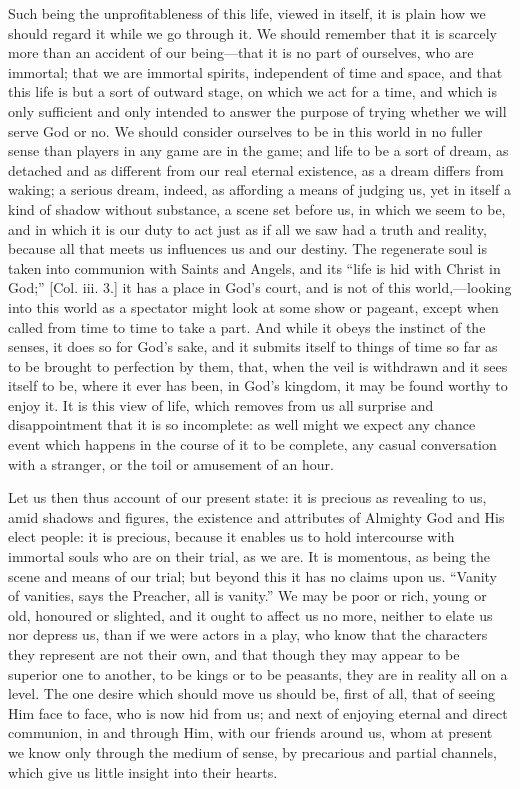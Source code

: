 Such being the unprofitableness of this life, viewed in itself, it
is plain how we should regard it while we go through it. We should
remember that it is scarcely more than an accident of our being—that
it is no part of ourselves, who are immortal; that we are immortal
spirits, independent of time and space, and that this life is but a
sort of outward stage, on which we act for a time, and which is only
sufficient and only intended to answer the purpose of trying whether
we will serve God or no. We should consider ourselves to be in this
world in no fuller sense than players in any game are in the game; and
life to be a sort of dream, as detached and as different from our real
eternal existence, as a dream differs from waking; a serious dream,
indeed, as affording a means of judging us, yet in itself a kind of
shadow without substance, a scene set before us, in which we seem to
be, and in which it is our duty to act just as if all we saw had a
truth and reality, because all that meets us influences us and our
destiny. The regenerate soul is taken into communion with Saints and
Angels, and its ``life is hid with Christ in God;'' [Col. iii.
3.] it has a place in God's court, and is not of this world,—looking
into this world as a spectator might look at some show or pageant,
except when called from time to time to take a part. And while it
obeys the instinct of the senses, it does so for God's sake, and it
submits itself to things of time so far as to be brought to perfection
by them, that, when the veil is withdrawn and it sees itself to be,
where it ever has been, in God's kingdom, it may be found worthy to
enjoy it. It is this view of life, which removes from us all surprise
and disappointment that it is so incomplete: as well might we expect
any chance event which happens in the course of it to be complete, any
casual conversation with a stranger, or the toil or amusement of an
hour.

Let us then thus account of our present state: it is precious as
revealing to us, amid shadows and figures, the existence and
attributes of Almighty God and His elect people: it is precious,
because it enables us to hold intercourse with immortal souls who are
on their trial, as we are. It is momentous, as being the scene and
means of our trial; but beyond this it has no claims upon us.
``Vanity of vanities, says the Preacher, all is vanity.'' We
may be poor or rich, young or old, honoured or slighted, and it ought
to affect us no more, neither to elate us nor depress us, than if we
were actors in a play, who know that the characters they represent are
not their own, and that though they may appear to be superior one to
another, to be kings or to be peasants, they are in reality all on a
level. The one desire which should move us should be, first of all,
that of seeing Him face to face, who is now hid from us; and next of
enjoying eternal and direct communion, in and through Him, with our
friends around us, whom at present we know only through the medium of
sense, by precarious and partial channels, which give us little
insight into their hearts.

